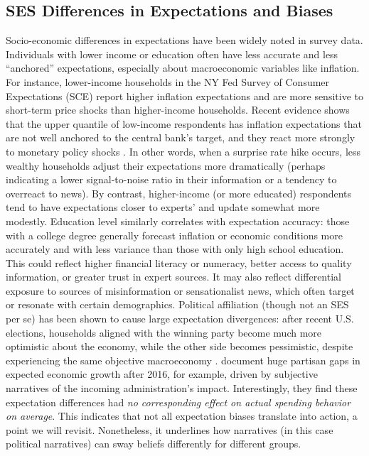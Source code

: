 \documentclass[12pt]{article}
\begin{document}
\subsection*{SES Differences in Expectations and Biases}
Socio-economic differences in expectations have been widely noted in survey data. Individuals with lower income or education often have less accurate and less ``anchored'' expectations, especially about macroeconomic variables like inflation. For instance, lower-income households in the NY Fed Survey of Consumer Expectations (SCE) report higher inflation expectations and are more sensitive to short-term price shocks than higher-income households. Recent evidence shows that the upper quantile of low-income respondents has inflation expectations that are not well anchored to the central bank's target, and they react more strongly to monetary policy shocks \citep{doh_lee_park_2024_rwp2406}. In other words, when a surprise rate hike occurs, less wealthy households adjust their expectations more dramatically (perhaps indicating a lower signal-to-noise ratio in their information or a tendency to overreact to news)\citep{doh_lee_park_2024_rwp2406}. By contrast, higher-income (or more educated) respondents tend to have expectations closer to experts' and update somewhat more modestly.
Education level similarly correlates with expectation accuracy: those with a college degree generally forecast inflation or economic conditions more accurately and with less variance than those with only high school education. This could reflect higher financial literacy or numeracy, better access to quality information, or greater trust in expert sources. It may also reflect differential exposure to sources of misinformation or sensationalist news, which often target or resonate with certain demographics.
Political affiliation (though not an SES per se) has been shown to cause large expectation divergences: after recent U.S. elections, households aligned with the winning party become much more optimistic about the economy, while the other side becomes pessimistic, despite experiencing the same objective macroeconomy \citep{miansufi2023}. \citet{miansufi2023} document huge partisan gaps in expected economic growth after 2016, for example, driven by subjective narratives of the incoming administration's impact. Interestingly, they find these expectation differences had \textit{no corresponding effect on actual spending behavior on average}. This indicates that not all expectation biases translate into action, a point we will revisit. Nonetheless, it underlines how narratives (in this case political narratives) can sway beliefs differently for different groups.
\end{document}
